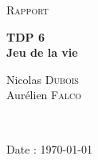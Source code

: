 \documentclass[12pt]{article}
\begin{document}
\begin{titlepage}
\begin{center}
\vspace*{3cm}
\textsc{\Large Rapport}\\[1.5cm]
\vspace{1cm}

	{ \huge \bfseries TDP 6\\[0.4cm] }
	{ \bfseries Jeu de la vie\\[0.4cm] }

\vspace{3cm}

	\begin{minipage}{0.5\textwidth}
	    \begin{center} \large
	             Nicolas \textsc{Dubois}\\
	             Aurélien \textsc{Falco}\\
	    \end{center}
	\end{minipage}
	\\[2cm]
    \end{center}

\vspace*{4cm}
\begin{flushright}Date : \today\end{flushright}
\end{titlepage}






\end{document}
